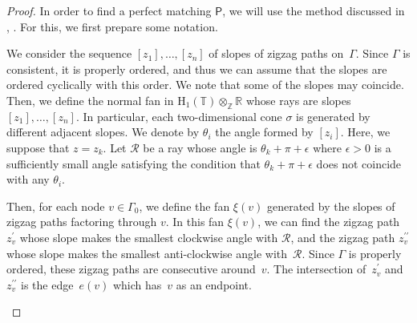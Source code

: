 \documentclass[pdftex]{sigma}%
\numberwithin{equation}{section}
\numberwithin{figure}{section}
\numberwithin{table}{section}
\newcommand{\ZZ}{\mathbb{Z}}
\newcommand{\RR}{\mathbb{R}}
\newcommand{\TT}{\mathbb{T}}
\newcommand{\rmH}{\mathrm{H}}
\newcommand{\calR}{\mathcal{R}}
\newcommand{\sfP}{\mathsf{P}}
\begin{document}
\begin{proof}
In order to find a perfect matching $\sfP$, we will use the method discussed in \cite[Section~3]{Gul}, \cite[Section~4]{Bro}.
For this, we first prepare some notation.

We consider the sequence $[z_1],\dots,[z_n]$ of slopes of zigzag paths on~$\Gamma$.
Since $\Gamma$ is consistent, it is properly ordered, and thus we can assume that the slopes are ordered cyclically with this order.
We note that some of the slopes may coincide.
Then, we define the normal fan in $\rmH_1(\TT)\otimes_\ZZ\RR$ whose rays are slopes $[z_1],\dots,[z_n]$.
In particular, each two-dimensional cone $\sigma$ is generated by different adjacent slopes.
We denote by $\theta_i$ the angle formed by $[z_i]$. Here, we suppose that $z=z_k$.
Let $\calR$ be a ray whose angle is $\theta_k+\pi+\epsilon$ where $\epsilon>0$ is a sufficiently small angle satisfying the condition that $\theta_k+\pi+\epsilon$ does not coincide with any $\theta_i$.

Then, for each node $v\in\Gamma_0$, we define the fan $\xi(v)$ generated by the slopes of zigzag paths factoring through $v$.
In this fan $\xi(v)$, we can find the zigzag path $z^\prime_v$ whose slope makes the smallest clockwise angle with $\calR$, and the zigzag path $z^{\prime\prime}_v$ whose slope makes the smallest anti-clockwise angle with~$\calR$.
Since $\Gamma$ is properly ordered, these zigzag paths are consecutive around~$v$.
The intersection of~$z^\prime_v$ and $z^{\prime\prime}_v$ is the edge~$e(v)$ which has~$v$ as an endpoint.

\begin{center}
{}
\end{center}
\end{proof}
\end{document}
